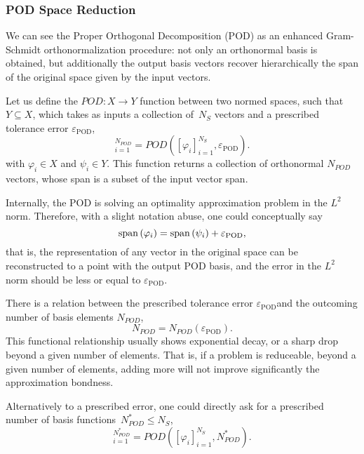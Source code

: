 \documentclass[../../thesis.tex]{subfiles}
\newcommand{\epspod}{\ensuremath{\varepsilon_\text{POD}}}
\begin{document}
\subsubsection{POD Space Reduction}
\label{sec:1d_rom_burgers_basis_construction_pod}
We can see the Proper Orthogonal Decomposition (POD) as 
an enhanced Gram-Schmidt orthonormalization procedure: not only an orthonormal basis is obtained, 
but additionally the output basis vectors recover hierarchically the span of the original space 
given by the input vectors.

Let us define the $POD: X \rightarrow Y$ function between two normed spaces, 
such that $Y \subseteq  X$, 
which takes as inputs a collection of~$N_S$ vectors and a prescribed tolerance error $\epspod$,
\begin{equation}
    [\psi_i]_{i=1}^{N_{POD}} = POD\left([\varphi_i]_{i=1}^{N_S}, \epspod\right).
\end{equation}
with $\varphi_i \in X$ and $\psi_i \in Y$.
This function returns a collection of orthonormal $N_{POD}$ vectors, whose span is a subset of the input vector span.

Internally, the POD is solving an optimality approximation problem in the $L^2$ norm. 
Therefore, with a slight notation abuse, one could conceptually say
\begin{equation}
    \spn{\varphi_i} = \spn{\psi_i} + \epspod,
\end{equation}
that is, the representation of any vector in the original space can be reconstructed to a point with the output POD basis, 
and the error in the $L^2$ norm should be less or equal to \epspod.

There is a relation between the prescribed tolerance error \epspod and the outcoming number of basis elements $N_{POD}$, 
\begin{equation}
    N_{POD} = N_{POD}(\epspod).
\end{equation}
This functional relationship usually shows exponential decay, or a sharp drop beyond a given number of elements.
That is, if a problem is reduceable, beyond a given number of elements, adding more will not improve significantly the approximation bondness. 

Alternatively to a prescribed error, one could directly ask for a prescribed number of basis functions~$N^{*}_{POD} \leq N_S$,
\begin{equation}
    [\psi_i]_{i=1}^{N^{*}_{POD}} = POD\left([\varphi_i]_{i=1}^{N_S}, N^{*}_{POD}\right).
\end{equation}
\end{document}
